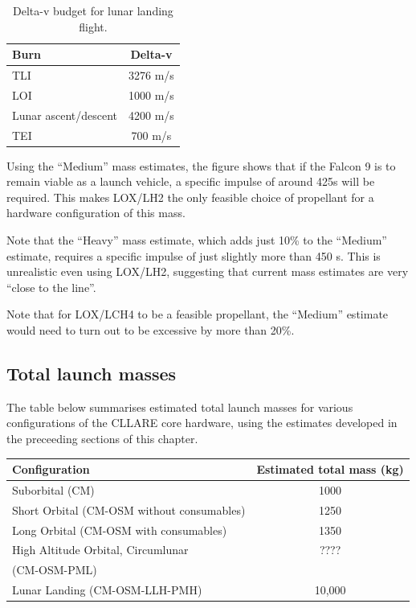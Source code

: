 \documentclass{report}
\begin{document}
\begin{table} \label{tab:fuel_analysis}
\centering
\caption{Delta-v budget for lunar landing flight.}
\begin{tabular}{ | l | c | }
\hline
\textbf{Burn} & \textbf{Delta-v} \\
\hline
\hline
TLI	& 3276 m/s \\
\hline
LOI	& 1000 m/s \\
\hline
Lunar ascent/descent	& 4200 m/s \\
\hline
TEI	& 700 m/s \\
\hline
\end{tabular}
\end{table}

Using the ``Medium'' mass estimates, the figure shows that if the Falcon 9 is to remain viable as a launch vehicle, a specific impulse of around 425s will be required.  This makes LOX/LH2 the only feasible choice of propellant for a hardware configuration of this mass.

Note that the ``Heavy'' mass estimate, which adds just 10\% to the ``Medium'' estimate, requires a specific impulse of just slightly more than 450 s.  This is unrealistic even using LOX/LH2, suggesting that current mass estimates are very ``close to the line''.

Note that for LOX/LCH4 to be a feasible propellant, the ``Medium'' estimate would need to turn out to be excessive by more than 20\%.

\subsection{Total launch masses}

The table below summarises estimated total launch masses for various configurations of the CLLARE core hardware, using the estimates developed in the preceeding sections of this chapter.

\begin{tabular}{ | l | c | }
\hline
Configuration & Estimated total mass (kg) \\
\hline
\hline
Suborbital (CM) & 1000 \\
\hline
Short Orbital (CM-OSM without consumables) & 1250 \\
\hline
Long Orbital (CM-OSM with consumables) & 1350 \\
\hline
High Altitude Orbital, Circumlunar & ???? \\
(CM-OSM-PML) & \\
\hline
Lunar Landing (CM-OSM-LLH-PMH) & 10,000 \\
\hline
\end{tabular}
\end{document}
